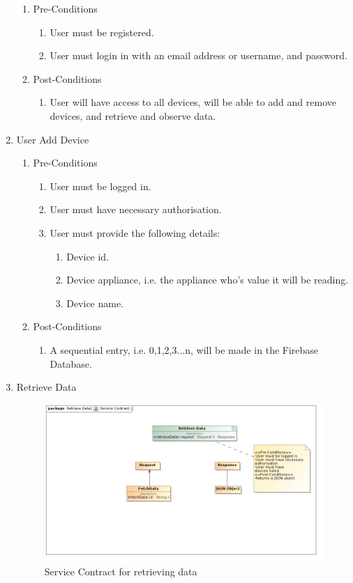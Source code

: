 \documentclass{article}
\begin{document}
\begin{enumerate}
		\begin{enumerate}
			\item  Pre-Conditions
			\begin{enumerate}
				\item	User must be registered.
				\item	User must login in with an email address or username, and password.
			\end{enumerate}
			\item  Post-Conditions		
			\begin{enumerate}
				\item	User will have access to all devices, will be able to add and remove devices, and retrieve and observe 
				data.
			\end{enumerate}
		\end{enumerate}
		\item	User Add Device
		\begin{enumerate}
			\item  Pre-Conditions
			\begin{enumerate}
				\item	User must be logged in.
				\item	User must have necessary authorisation.
				\item	User must provide the following details:
				\begin{enumerate}
					\item	Device id.
					\item	Device appliance, i.e. the appliance who's value it will be reading.
					\item	Device name.
				\end{enumerate}
			\end{enumerate}
			\item  Post-Conditions		
			\begin{enumerate}
				\item	A sequential entry, i.e. 0,1,2,3...n, will be made in the Firebase Database.
			\end{enumerate}
		\end{enumerate}
		\item	Retrieve Data
		
		\begin{figure}[H]
			\includegraphics[width=\textwidth]{images/RetrieveDataServiceContract.jpg}
			\caption{Service Contract for retrieving data \label{overflow}}
		\end{figure}
		

\end{enumerate}
\end{document}

